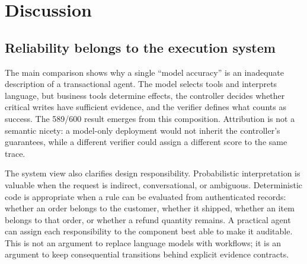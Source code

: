 \documentclass[11pt]{article}
\begin{document}
\begin{table}[t]
\centering
\caption{Reinforcement-learning evidence. Dataset and protocol differ between v17 and v18.}
\label{tab:grpo}
\scriptsize
{}
\end{table}

\section{Discussion}
\label{sec:discussion}

\subsection{Reliability belongs to the execution system}

The main comparison shows why a single ``model accuracy'' is an inadequate description of a transactional agent. The model selects tools and interprets language, but business tools determine effects, the controller decides whether critical writes have sufficient evidence, and the verifier defines what counts as success. The 589/600 result emerges from this composition. Attribution is not a semantic nicety: a model-only deployment would not inherit the controller's guarantees, while a different verifier could assign a different score to the same trace.

The system view also clarifies design responsibility. Probabilistic interpretation is valuable when the request is indirect, conversational, or ambiguous. Deterministic code is appropriate when a rule can be evaluated from authenticated records: whether an order belongs to the customer, whether it shipped, whether an item belongs to that order, or whether a refund quantity remains. A practical agent can assign each responsibility to the component best able to make it auditable. This is not an argument to replace language models with workflows; it is an argument to keep consequential transitions behind explicit evidence contracts.
\end{document}
